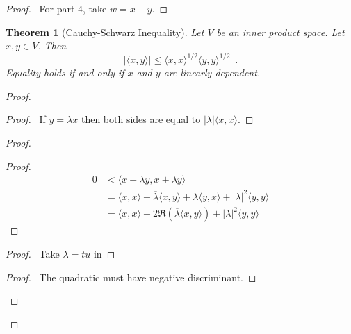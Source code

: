 \documentclass{book}
\let\qed\relax
\newtheorem{thm}[ax]{Theorem}
\theoremstyle{definition}
\begin{document}
\begin{proof}
\pf\ For part 4, take $w = x - y$. \qed
\end{proof}

\begin{thm}[Cauchy-Schwarz Inequality]
Let $V$ be an inner product space. Let $x,y \in V$. Then
\[ |\langle x,y \rangle| \leq \langle x,x \rangle^{1/2} \langle y,y \rangle^{1/2} \enspace . \]
Equality holds if and only if $x$ and $y$ are linearly dependent.
\end{thm}

\begin{proof}
\pf
{}
\begin{proof}
	\pf\ If $y = \lambda x$ then both sides are equal to $|\lambda| \langle x,x \rangle$.
\end{proof}
\begin{proof}
	\begin{proof}
		\pf
		\begin{align*}
			0 & < \langle x + \lambda y, x + \lambda y \rangle \\
			& = \langle x,x \rangle + \overline{\lambda} \langle x,y \rangle + \lambda \langle y,x \rangle + |\lambda|^2 \langle y,y \rangle \\
			& = \langle x,x \rangle + 2 \Re (\overline{\lambda} \langle x,y \rangle) + |\lambda|^2 \langle y,y \rangle
		\end{align*}
	\end{proof}
	\begin{proof}
		\pf\ Take $\lambda = tu$ in 
	\end{proof}
	\begin{proof}
		\pf\ The quadratic  must have negative discriminant.
	\end{proof}
\end{proof}
\qed
\end{proof}
\end{document}

